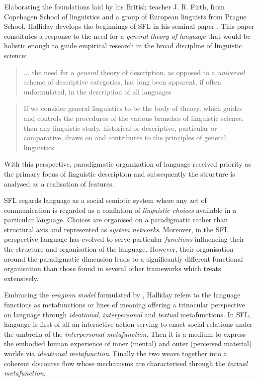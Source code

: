 Elaborating the foundations laid by his British teacher J. R. Firth, \citet{Hjelmslev53} from Copehagen School of linguistics and a group of European linguists from Prague School, Halliday develops the beginnings of SFL in his seminal paper \cite{Halliday61-orig}. This paper constitutes a response to the need for a \textit{general theory of language} that would be holistic enough to guide empirical research in the broad discipline of linguistic science:
\begin{quotation}
    ... the need for a \textit{general} theory of description, as opposed to a \textit{universal} scheme of descriptive categories, has long been apparent, if often unformulated, in the description of all languages \citep[p.54; emphasis in original]{Halliday57}
\end{quotation} 
\begin{quotation}
    If we consider general linguistics to be the body of theory, which guides and controls the procedures of the various branches of linguistic science, then any linguistic study, historical or descriptive, particular or comparative, draws on and contributes to the principles of general linguistics \citep[p.55]{Halliday57}
\end{quotation} 

With this perspective, paradigmatic organization of language received priority as the primary focus of linguistic description and subsequently the structure is analysed as a realisation of features. 

SFL regards language as a social semiotic system where any act of communication is regarded as a conflation of \textit{linguistic choices} available in a particular language. Choices are organised on a paradigmatic rather than structural axis and represented as \textit{system networks}. Moreover, in the SFL perspective language has evolved to serve particular \textit{functions} influencing their the structure and organisation of the language. However, their organisation around the paradigmatic dimension leads to a significantly different functional organisation than those found in several other frameworks which \citet{Butler2003-pt1, Butler2003-pt2} treats extensively. 

Embracing the \textit{oragnon model} formulated by \citet{Buhler34}, Halliday refers to the language functions as metafunctions or lines of meaning offering a trinocular perspective on language through \textit{ideational}, \textit{interpersonal} and \textit{textual} metafunctions. In SFL, language is first of all an interactive action serving to enact social relations under the umbrella of the \textit{interpersonal metafunction}. Then it is a medium to express the embodied human experience of inner (mental) and outer (perceived material) worlds via \textit{ideational metafunction}. Finally the two weave together into a coherent discourse flow whose mechanisms are characterised through the \textit{textual metafunction}.

